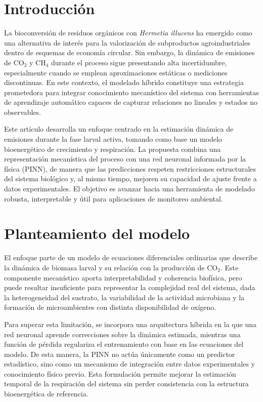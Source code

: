 \section{Introducción}

La bioconversión de residuos orgánicos con \textit{Hermetia illucens} ha emergido como una alternativa de interés para la valorización de subproductos agroindustriales dentro de esquemas de economía circular. Sin embargo, la dinámica de emisiones de CO$_2$ y CH$_4$ durante el proceso sigue presentando alta incertidumbre, especialmente cuando se emplean aproximaciones estáticas o mediciones discontinuas. En este contexto, el modelado híbrido constituye una estrategia prometedora para integrar conocimiento mecanístico del sistema con herramientas de aprendizaje automático capaces de capturar relaciones no lineales y estados no observables.

Este artículo desarrolla un enfoque centrado en la estimación dinámica de emisiones durante la fase larval activa, tomando como base un modelo bioenergético de crecimiento y respiración. La propuesta combina una representación mecanística del proceso con una red neuronal informada por la física (PINN), de manera que las predicciones respeten restricciones estructurales del sistema biológico y, al mismo tiempo, mejoren su capacidad de ajuste frente a datos experimentales. El objetivo es avanzar hacia una herramienta de modelado robusta, interpretable y útil para aplicaciones de monitoreo ambiental.

\section{Planteamiento del modelo}

El enfoque parte de un modelo de ecuaciones diferenciales ordinarias que describe la dinámica de biomasa larval y su relación con la producción de CO$_2$. Este componente mecanístico aporta interpretabilidad y coherencia biofísica, pero puede resultar insuficiente para representar la complejidad real del sistema, dada la heterogeneidad del sustrato, la variabilidad de la actividad microbiana y la formación de microambientes con distinta disponibilidad de oxígeno.

Para superar esta limitación, se incorpora una arquitectura híbrida en la que una red neuronal aprende correcciones sobre la dinámica estimada, mientras una función de pérdida regulariza el entrenamiento con base en las ecuaciones del modelo. De esta manera, la PINN no actúa únicamente como un predictor estadístico, sino como un mecanismo de integración entre datos experimentales y conocimiento físico previo. Esta formulación permite mejorar la estimación temporal de la respiración del sistema sin perder consistencia con la estructura bioenergética de referencia.

